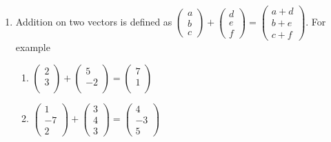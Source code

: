 \documentclass{article}
\begin{document}
\begin{enumerate}
    \item Addition on two vectors is defined as $ \begin{pmatrix}
  a\\
  b\\
  c
 \end{pmatrix}
 +
 \begin{pmatrix}
 d\\
 e\\
 f
\end{pmatrix}
=
 \begin{pmatrix}
a+d\\
b+e\\
c+f
\end{pmatrix}$. For example\\
            \begin{enumerate}
                 \item
                    $\begin{pmatrix}
                      2\\                   3\\
                     \end{pmatrix}
                      +
                     \begin{pmatrix}
                        5\\
                        -2\\
                    \end{pmatrix}
                    =
                    \begin{pmatrix}
                        7\\
                        1\\
                    \end{pmatrix}$\\
                \item
                    $\begin{pmatrix}
                    1\\
                    -7\\
                    2
                    \end{pmatrix}
                    +
                    \begin{pmatrix}
                        3\\
                        4\\
                        3
                    \end{pmatrix}
                     =
                    \begin{pmatrix}
                    4\\
                    -3\\
                    5
                    \end{pmatrix}$\\
            \end{enumerate}




\end{enumerate}
\end{document}
